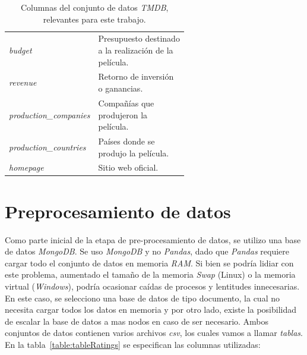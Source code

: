 \documentclass[11pt,a4paper,twoside]{thesis}
\begin{document}
\begin{table}[!htb]
\begin{tabular}{l | p{0.6\linewidth}}
		\textit{budget}                           & Presupuesto destinado a la realización de la película.                                \\
		\textit{revenue}                          & Retorno de inversión o ganancias.                                                     \\
		\textit{production\_companies}            & Compañías que produjeron la película.                                                 \\
		\textit{production\_countries}            & Países donde se produjo la película.                                                  \\
		\textit{homepage}                         & Sitio web oficial.                                                                    \\

		\hline
	\end{tabular}
	\caption{
		Columnas del conjunto de datos \textit{TMDB}, relevantes para este trabajo.
	}
	\label{table:tmdbColumns}
\end{table}

\clearpage

\section{Preprocesamiento de datos}
\label{sec:pre-pro}



Como parte inicial de la etapa de pre-procesamiento de datos, se utilizo una base de datos \textit{MongoDB}. Se uso \textit{MongoDB} y no \textit{Pandas}, dado que \textit{Pandas} requiere cargar todo el conjunto de datos en memoria \textit{RAM}. Si bien se podría lidiar con este problema, aumentado el tamaño de la memoria \textit{Swap} (Linux) o la memoria
virtual (\textit{Windows}), podría ocasionar caídas de procesos y lentitudes innecesarias. En este caso, se selecciono una base de datos de tipo documento, la cual no necesita cargar todos los datos en memoria y por otro lado, existe la posibilidad de escalar la base de datos a mas nodos en caso de ser necesario. Ambos conjuntos de datos contienen varios archivos \textit{csv}, los cuales vamos a llamar \textit{tablas}. En la tabla~\ref{table:tableRatings} se
especifican las columnas utilizadas:
\end{document}

